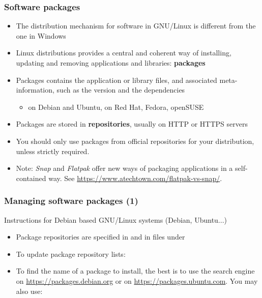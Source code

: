 \begin{frame}
  \frametitle{Software packages}
  \begin{itemize}
  \item The distribution mechanism for software in GNU/Linux is
    different from the one in Windows
  \item Linux distributions provides a central and coherent way of
    installing, updating and removing applications and libraries:
    {\bf packages}
  \item Packages contains the application or library files, and
    associated meta-information, such as the version and the
    dependencies
    \begin{itemize}
    \item {} on Debian and Ubuntu,  on Red Hat,
      Fedora, openSUSE
    \end{itemize}
  \item Packages are stored in {\bf repositories}, usually on HTTP or
    HTTPS servers
  \item You should only use packages from official repositories for your
    distribution, unless strictly required.
  \item Note: {\em Snap} and {\em Flatpak} offer new ways of packaging
    applications in a self-contained way. See
    \url{https://www.atechtown.com/flatpak-vs-snap/}.

\end{itemize}
\end{frame}

\begin{frame}
  \frametitle{Managing software packages (1)}
  Instructions for Debian based GNU/Linux systems (Debian, Ubuntu...)
  \begin{itemize}
  \item Package repositories are specified in 
	and in files under 
  \item To update package repository lists:\\
  \item To find the name of a package to install, the best is to use
    the search engine on \url{https://packages.debian.org} or on
    \url{https://packages.ubuntu.com}. You may
    also use:\\
  \end{itemize}
\end{frame}

